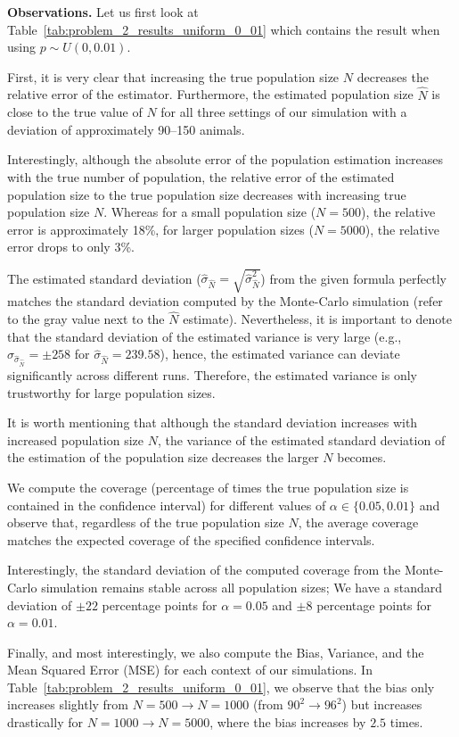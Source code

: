\documentclass{article}
\begin{document}
\textbf{Observations.}
Let us first look at Table~\ref{tab:problem_2_results_uniform_0_01} which contains the result when using $p\sim U(0, 0.01)$.

First, it is very clear that increasing the true population size $N$ decreases the relative error of the estimator. 
Furthermore, the estimated population size $\hat{N}$ is close to the true value of $N$ for all three settings of our simulation with a deviation of approximately 90--150 animals. 

Interestingly, although the absolute error of the population estimation increases with the true number of population, the relative error of the estimated population size to the true population size decreases with increasing true population size $N$. Whereas for a small population size ($N=500$), the relative error is approximately 18\%, for larger population sizes ($N=5000$), the relative error drops to only 3\%.

The estimated standard deviation ($\hat{\sigma}_{\hat{N}} = \sqrt{\hat{\sigma}_{\hat{N}}^2}$) from the given formula perfectly matches the standard deviation computed by the Monte-Carlo simulation (refer to the gray value next to the $\hat{N}$ estimate).
Nevertheless, it is important to denote that the standard deviation of the estimated variance is very large (e.g., $\sigma_{\hat{\sigma}_{\hat{N}}} = \pm 258$ for $\hat{\sigma}_{\hat{N}} = 239.58$), hence, the estimated variance can deviate significantly across different runs. Therefore, the estimated variance is only trustworthy for large population sizes.

It is worth mentioning that although the standard deviation increases with increased population size $N$, the variance of the estimated standard deviation of the estimation of the population size decreases the larger $N$ becomes. 

We compute the coverage (percentage of times the true population size is contained in the confidence interval) for different values of $\alpha\in \{0.05, 0.01\}$ and observe that, regardless of the true population size $N$, the average coverage matches the expected coverage of the specified confidence intervals.

Interestingly, the standard deviation of the computed coverage from the Monte-Carlo simulation remains stable across all population sizes; We have a standard deviation of $\pm 22$ percentage points for $\alpha=0.05$ and $\pm 8$ percentage points for $\alpha = 0.01$.

Finally, and most interestingly, we also compute the Bias, Variance, and the Mean Squared Error (MSE) for each context of our simulations.
In Table~\ref{tab:problem_2_results_uniform_0_01}, we observe that the bias only increases slightly from $N=500 \to N=1000$ (from $90^2 \to 96^2$) but increases drastically for $N=1000 \to N=5000$, where the bias increases by $2.5$ times.
\end{document}
